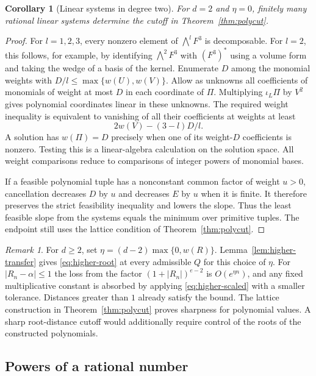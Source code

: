 \documentclass[11pt,a4paper,reqno]{amsart}
\newtheorem{corollary}[theorem]{Corollary}
\theoremstyle{definition}
\theoremstyle{remark}
\newtheorem{remark}[theorem]{Remark}
\numberwithin{equation}{section}
\begin{document}
\begin{corollary}[Linear systems in degree two]\label{cor:higher-linear}
For \(d=2\) and \(\eta=0\), finitely many rational linear
systems determine the cutoff in Theorem~\ref{thm:polycut}.
\end{corollary}

\begin{proof}
For \(l=1,2,3\), every nonzero element of
\(\bigwedge^l F^3\) is decomposable. For \(l=2\), this follows,
for example, by identifying \(\bigwedge^2 F^3\) with
\((F^3)^*\) using a volume form and taking the wedge of a
basis of the kernel. Enumerate \(D\) among the monomial
weights with \(D/l\le\max\{w(U),w(V)\}\). Allow as unknowns
all coefficients of monomials of weight at most \(D\) in
each coordinate of \(\Pi\). Multiplying \(\iota_L\Pi\)
by \(V^2\) gives polynomial coordinates linear in these
unknowns. The required weight inequality is equivalent to
vanishing of all their coefficients at weights at least
\[
  2w(V)-(3-l)D/l.
\]
A solution has \(w(\Pi)=D\) precisely when one of its
weight-\(D\) coefficients is nonzero. Testing this is a
linear-algebra calculation on the solution space. All
weight comparisons reduce to comparisons of integer
powers of monomial bases.

If a feasible polynomial tuple has a nonconstant common
factor of weight \(u>0\), cancellation decreases \(D\) by
\(u\) and decreases \(E\) by \(u\) when it is finite. It
therefore preserves the strict feasibility inequality
and lowers the slope. Thus the least feasible slope from
the systems equals the minimum over primitive tuples.
The endpoint still uses the lattice condition of
Theorem~\ref{thm:polycut}.
\end{proof}

\begin{remark}
For \(d\ge2\), set \(\eta=(d-2)\max\{0,w(R)\}\).
Lemma~\ref{lem:higher-transfer} gives
\eqref{eq:higher-root} at every admissible \(Q\) for this
choice of \(\eta\). For \(|R_n-\alpha|\le1\) the loss
from the factor \((1+|R_n|)^{e-2}\) is \(O(e^{\eta n})\),
and any fixed multiplicative constant is absorbed by
applying \eqref{eq:higher-scaled} with a smaller tolerance.
Distances greater than \(1\) already satisfy the bound.
The lattice construction in Theorem~\ref{thm:polycut}
proves sharpness for polynomial values. A sharp
root-distance cutoff would additionally require
control of the roots of the constructed polynomials.
\end{remark}


\subsection{Powers of a rational number}
\end{document}

